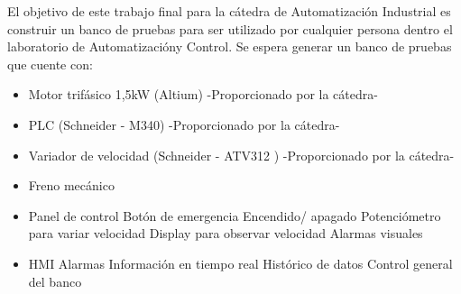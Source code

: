 El objetivo de este trabajo final para la cátedra de Automatización Industrial es construir un banco de pruebas para ser utilizado por cualquier persona dentro el laboratorio de Automatizacióny Control. Se espera generar un banco de pruebas que cuente con:
\begin{itemize}
    \item Motor trifásico 1,5kW (Altium) -Proporcionado por la cátedra-
    \item PLC (Schneider - M340) -Proporcionado por la cátedra-
    \item Variador de velocidad (Schneider - ATV312 ) -Proporcionado por la cátedra-
    \item Freno mecánico
    \item Panel de control
        \subitem Botón de emergencia
        \subitem Encendido/ apagado
        \subitem Potenciómetro para variar velocidad
        \subitem Display para observar velocidad
        \subitem Alarmas visuales
    \item HMI
        \subitem Alarmas
        \subitem Información en tiempo real
        \subitem Histórico de datos
        \subitem Control general del banco
\end{itemize}

\newpage